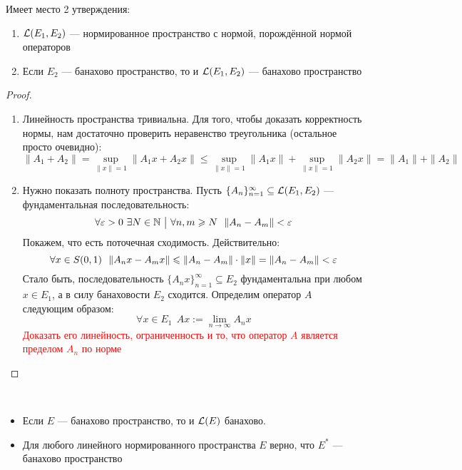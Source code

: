\begin{theorem}
	Имеет место 2 утверждения:
	\begin{enumerate}
		\item $\mathcal{L}(E_1, E_2)$ --- нормированное пространство с нормой, порождённой нормой операторов
		
		\item Если $E_2$ --- банахово пространство, то и $\mathcal{L}(E_1, E_2)$ --- банахово пространство
	\end{enumerate}
\end{theorem}

\begin{proof}~
	\begin{enumerate}
		\item Линейность пространства тривиальна. Для того, чтобы доказать корректность нормы, нам достаточно проверить неравенство треугольника (остальное просто очевидно):
		\[
			\|A_1 + A_2\| = \sup_{\|x\| = 1} \|A_1x + A_2x\| \le \sup_{\|x\| = 1} \|A_1x\| + \sup_{\|x\| = 1} \|A_2x\| = \|A_1\| + \|A_2\|
		\]
		
		\item Нужно показать полноту пространства. Пусть $\{A_n\}_{n = 1}^\infty \subseteq \mathcal{L}(E_1, E_2)$ --- фундаментальная последовательность:
		\[
			\forall \varepsilon > 0\ \exists N \in \mathbb{N} \ \big|\  \forall n, m \geqslant N\ \ \|A_n - A_m\| < \varepsilon
		\]
		Покажем, что есть поточечная сходимость. Действительно:
		\[
			\forall x \in S(0, 1)\ \ \|A_nx - A_mx\| \leqslant \|A_n - A_m\| \cdot \|x\| = \|A_n - A_m\| < \varepsilon
		\]
		Стало быть, последовательность $\{A_nx\}_{n = 1}^\infty \subseteq E_2$ фундаментальна при любом $x \in E_1$, а в силу банаховости $E_2$ сходится. Определим оператор $A$ следующим образом:
		\[
			\forall x \in E_1\ \ Ax := \lim_{n \to \infty} A_nx
		\]
		\textcolor{red}{Доказать его линейность, ограниченность и то, что оператор $A$ является пределом $A_n$ по норме}
	\end{enumerate}
\end{proof}

\begin{corollary}~
	\begin{itemize}
		\item Если $E$ --- банахово пространство, то и $\mathcal{L}(E)$ банахово.
		
		\item Для любого линейного нормированного пространства $E$ верно, что $E^*$ --- банахово пространство
	\end{itemize}
\end{corollary}

